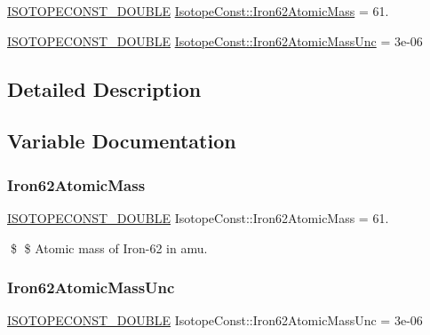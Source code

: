 \begin{DoxyCompactItemize}
\item 
\mbox{\hyperlink{group___isotope_const-_macros_ga8f45a7272ce02c0b4c65c44636ed719a}{I\+S\+O\+T\+O\+P\+E\+C\+O\+N\+S\+T\+\_\+\+D\+O\+U\+B\+LE}} \mbox{\hyperlink{group___isotope_const-_iron-_fe62_ga4a4209d776c3b3e9791ef2161a88fe42}{Isotope\+Const\+::\+Iron62\+Atomic\+Mass}} = 61.
\item 
\mbox{\hyperlink{group___isotope_const-_macros_ga8f45a7272ce02c0b4c65c44636ed719a}{I\+S\+O\+T\+O\+P\+E\+C\+O\+N\+S\+T\+\_\+\+D\+O\+U\+B\+LE}} \mbox{\hyperlink{group___isotope_const-_iron-_fe62_gadfed81723c9ddc58bed5515b9af8da14}{Isotope\+Const\+::\+Iron62\+Atomic\+Mass\+Unc}} = 3e-\/06
\end{DoxyCompactItemize}


\subsection{Detailed Description}


\subsection{Variable Documentation}
\mbox{\label{group___isotope_const-_iron-_fe62_ga4a4209d776c3b3e9791ef2161a88fe42}} 
\subsubsection{\texorpdfstring{Iron62\+Atomic\+Mass}{Iron62AtomicMass}}
{\footnotesize\ttfamily \mbox{\hyperlink{group___isotope_const-_macros_ga8f45a7272ce02c0b4c65c44636ed719a}{I\+S\+O\+T\+O\+P\+E\+C\+O\+N\+S\+T\+\_\+\+D\+O\+U\+B\+LE}} Isotope\+Const\+::\+Iron62\+Atomic\+Mass = 61.}

\$ \$ Atomic mass of Iron-\/62 in amu. \mbox{\label{group___isotope_const-_iron-_fe62_gadfed81723c9ddc58bed5515b9af8da14}} 
\subsubsection{\texorpdfstring{Iron62\+Atomic\+Mass\+Unc}{Iron62AtomicMassUnc}}
{\footnotesize\ttfamily \mbox{\hyperlink{group___isotope_const-_macros_ga8f45a7272ce02c0b4c65c44636ed719a}{I\+S\+O\+T\+O\+P\+E\+C\+O\+N\+S\+T\+\_\+\+D\+O\+U\+B\+LE}} Isotope\+Const\+::\+Iron62\+Atomic\+Mass\+Unc = 3e-\/06}

